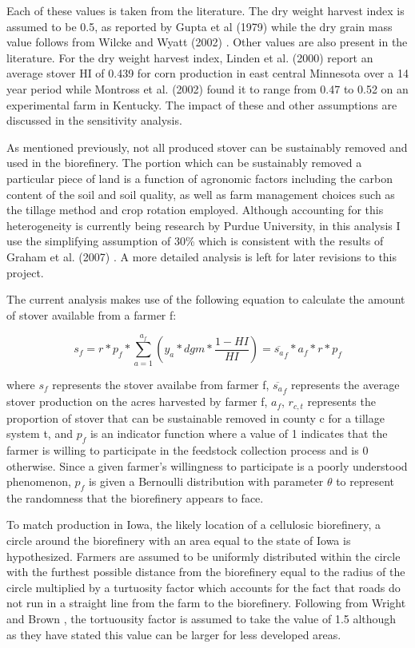 \documentclass{article}\usepackage[]{graphicx}\usepackage[]{color}
\begin{document}
Each of these values is taken from the literature.  The dry weight harvest index is assumed to be 0.5, as reported by Gupta et al (1979) \cite{Gupta} while the dry grain mass value follows from Wilcke and Wyatt (2002) \cite{Wilcke and Wyatt}.  Other values are also present in the literature.  For the dry weight harvest index, Linden et al. (2000) \cite{Linden et al} report an average stover HI of 0.439 for corn production in east central Minnesota over a 14 year period while Montross et al. (2002) \cite{Montross et al} found it to range from 0.47 to 0.52 on an experimental farm in Kentucky.  The impact of these and other assumptions are discussed in the sensitivity analysis.

As mentioned previously, not all produced stover can be sustainably removed and used in the biorefinery.  The portion which can be sustainably removed a particular piece of land is a function of agronomic factors including the carbon content of the soil and soil quality, as well as farm management choices such as the tillage method and crop rotation employed.  Although accounting for this heterogeneity is currently being research by Purdue University, in this analysis I use the simplifying assumption of 30\% which is consistent with the results of Graham et al. (2007) \cite{Graham et al}.  A more detailed analysis is left for later revisions to this project.

The current analysis makes use of the following equation to calculate the amount of stover available from a farmer f:

\begin{equation}\tag{3}
s_f= r*p_f* \sum_{a=1}^{a_f} (y_a * dgm * \frac{1-HI}{HI})  = \overline{s_a}_f*a_f*r*p_f
\end{equation}

where $s_f$ represents the stover availabe from farmer f, $\overline{s_a}_f$ represents the average stover production on the acres harvested by farmer f, $a_f$, $r_{c,t}$ represents the proportion of stover that can be sustainable removed in county c for a tillage system t, and $p_f$ is an indicator function where a value of 1 indicates that the farmer is willing to participate in the feedstock collection process and is 0 otherwise.  Since a given farmer's willingness to participate is a poorly understood phenomenon, $p_f$ is given a Bernoulli distribution with parameter $\theta$ to represent the randomness that the biorefinery appears to face.

To match production in Iowa, the likely location of a cellulosic biorefinery, a circle around the biorefinery with an area equal to the state of Iowa is hypothesized.  Farmers are assumed to be uniformly distributed within the circle with the furthest possible distance from the biorefinery equal to the radius of the circle multiplied by a turtuosity factor which accounts for the fact that roads do not run in a straight line from the farm to the biorefinery.  Following from Wright and Brown \cite{Wright and Brown}, the tortuousity factor is assumed to take the value of 1.5 although as they have stated this value can be larger for less developed areas.  
\end{document}
